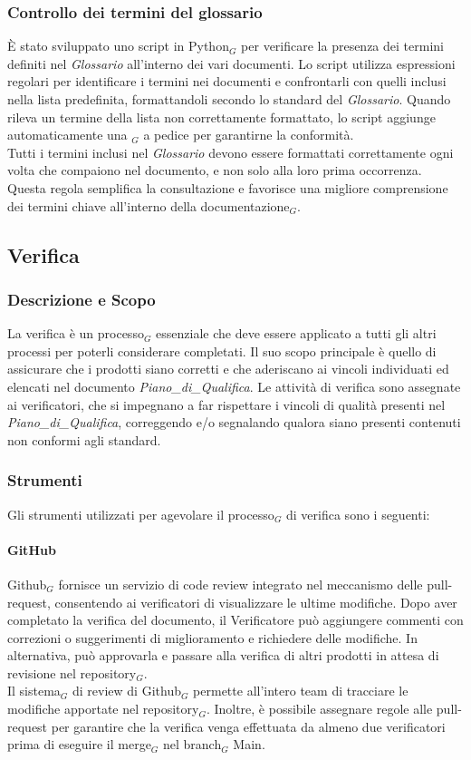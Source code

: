 \documentclass[10pt]{article}
\begin{document}
\begin{justify}
    \subsubsection{Controllo dei termini del glossario}
    È stato sviluppato uno script in Python$_G$ per verificare la presenza dei termini definiti nel \textit{Glossario} all'interno dei vari documenti. Lo script utilizza espressioni regolari per identificare i termini nei documenti e confrontarli con quelli inclusi nella lista predefinita, formattandoli secondo lo standard del \textit{Glossario}. Quando rileva un termine della lista non correttamente formattato, lo script aggiunge automaticamente una $_G$ a pedice per garantirne la conformità.\\
    Tutti i termini inclusi nel \textit{Glossario} devono essere formattati correttamente ogni volta che compaiono nel documento, e non solo alla loro prima occorrenza. Questa regola semplifica la consultazione e favorisce una migliore comprensione dei termini chiave all'interno della documentazione$_G$.

    \subsection{Verifica}
    \label{verifica}
    \subsubsection{Descrizione e Scopo} 
    La verifica è un processo$_G$ essenziale che deve essere applicato a tutti gli altri processi per poterli considerare completati. Il suo scopo principale è quello di assicurare che i prodotti siano corretti e che aderiscano ai vincoli individuati ed elencati nel documento \textit{Piano\_di\_Qualifica}. Le attività di verifica sono assegnate ai verificatori, che si impegnano a far rispettare i vincoli di qualità presenti nel \textit{Piano\_di\_Qualifica}, correggendo e/o segnalando qualora siano presenti contenuti non conformi agli standard.
    \subsubsection{Strumenti}
    Gli strumenti utilizzati per agevolare il processo$_G$ di verifica sono i seguenti:
    \paragraph{GitHub}
    Github$_G$ fornisce un servizio di code review integrato nel meccanismo delle pull-request, consentendo ai verificatori di visualizzare le ultime modifiche. Dopo aver completato la verifica del documento, il Verificatore può aggiungere commenti con correzioni o suggerimenti di miglioramento e richiedere delle modifiche. In alternativa, può approvarla e passare alla verifica di altri prodotti in attesa di revisione nel repository$_G$.\\
    Il sistema$_G$ di review di Github$_G$ permette all'intero team di tracciare le modifiche apportate nel repository$_G$. Inoltre, è possibile assegnare regole alle pull-request per garantire che la verifica venga effettuata da almeno due verificatori prima di eseguire il merge$_G$ nel branch$_G$ Main.


\end{justify}
\end{document}
